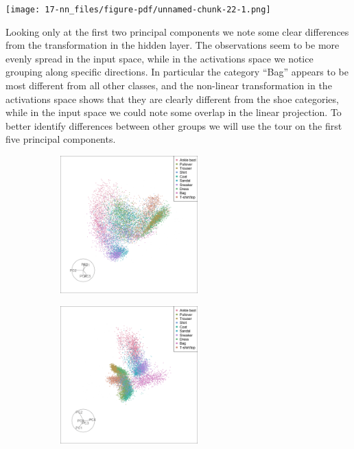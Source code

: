 \documentclass[
  letterpaper,
]{krantz}
\begin{document}
\texttt{[image: 17-nn\_files/figure-pdf/unnamed-chunk-22-1.png]}

Looking only at the first two principal components we note some clear
differences from the transformation in the hidden layer. The
observations seem to be more evenly spread in the input space, while in
the activations space we notice grouping along specific directions. In
particular the category ``Bag'' appears to be most different from all
other classes, and the non-linear transformation in the activations
space shows that they are clearly different from the shoe categories,
while in the input space we could note some overlap in the linear
projection. To better identify differences between other groups we will
use the tour on the first five principal components.

\begin{figure}

\begin{minipage}{0.50\linewidth}

\begin{figure}[H]

{\centering \includegraphics[width=2.08333in,height=\textheight,keepaspectratio]{images/fashion_images_gt_36.png}

}


\end{figure}%

\end{minipage}%
%
\begin{minipage}{0.50\linewidth}

\begin{figure}[H]

{\centering \includegraphics[width=2.08333in,height=\textheight,keepaspectratio]{images/fashion_activation_gt_126.png}

}
\end{figure}
\end{minipage}
\end{figure}
\end{document}
